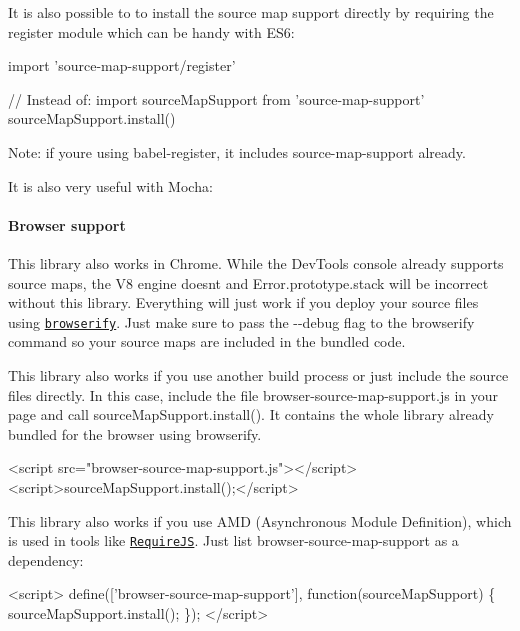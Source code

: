 It is also possible to to install the source map support directly by requiring the {\ttfamily register} module which can be handy with E\+S6\+:


\begin{DoxyCode}
import 'source-map-support/register'

// Instead of:
import sourceMapSupport from 'source-map-support'
sourceMapSupport.install()
\end{DoxyCode}
 Note\+: if you\textquotesingle{}re using babel-\/register, it includes source-\/map-\/support already.

It is also very useful with Mocha\+:




\paragraph*{Browser support}

This library also works in Chrome. While the Dev\+Tools console already supports source maps, the V8 engine doesn\textquotesingle{}t and {\ttfamily Error.\+prototype.\+stack} will be incorrect without this library. Everything will just work if you deploy your source files using \href{http://browserify.org/}{\tt browserify}. Just make sure to pass the {\ttfamily -\/-\/debug} flag to the browserify command so your source maps are included in the bundled code.

This library also works if you use another build process or just include the source files directly. In this case, include the file {\ttfamily browser-\/source-\/map-\/support.\+js} in your page and call {\ttfamily source\+Map\+Support.\+install()}. It contains the whole library already bundled for the browser using browserify.


\begin{DoxyCode}
<script src="browser-source-map-support.js"></script>
<script>sourceMapSupport.install();</script>
\end{DoxyCode}


This library also works if you use A\+MD (Asynchronous Module Definition), which is used in tools like \href{http://requirejs.org/}{\tt Require\+JS}. Just list {\ttfamily browser-\/source-\/map-\/support} as a dependency\+:


\begin{DoxyCode}
<script>
  define(['browser-source-map-support'], function(sourceMapSupport) \{
    sourceMapSupport.install();
  \});
</script>
\end{DoxyCode}



